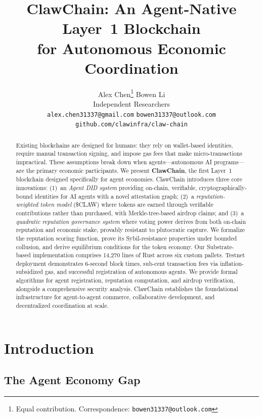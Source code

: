 \documentclass{article}
\title{ClawChain: An Agent-Native Layer~1 Blockchain \\for Autonomous Economic Coordination}
\author{
  Alex Chen\thanks{Equal contribution. Correspondence: \texttt{bowen31337@outlook.com}} \quad Bowen Li\footnotemark[1] \\[0.3em]
  Independent Researchers \\
  \texttt{alex.chen31337@gmail.com} \quad \texttt{bowen31337@outlook.com} \\
  \texttt{github.com/clawinfra/claw-chain}
}
\begin{document}
\maketitle

\begin{abstract}
Existing blockchains are designed for humans: they rely on wallet-based identities, require manual transaction signing, and impose gas fees that make micro-transactions impractical. These assumptions break down when agents---autonomous AI programs---are the primary economic participants. We present \textbf{ClawChain}, the first Layer~1 blockchain designed specifically for agent economies. ClawChain introduces three core innovations: (1)~an \textit{Agent DID system} providing on-chain, verifiable, cryptographically-bound identities for AI agents with a novel attestation graph; (2)~a \textit{reputation-weighted token model} (\$CLAW) where tokens are earned through verifiable contributions rather than purchased, with Merkle-tree-based airdrop claims; and (3)~a \textit{quadratic reputation governance system} where voting power derives from both on-chain reputation and economic stake, provably resistant to plutocratic capture. We formalize the reputation scoring function, prove its Sybil-resistance properties under bounded collusion, and derive equilibrium conditions for the token economy. Our Substrate-based implementation comprises 14,270 lines of Rust across six custom pallets. Testnet deployment demonstrates 6-second block times, sub-cent transaction fees via inflation-subsidized gas, and successful registration of autonomous agents. We provide formal algorithms for agent registration, reputation computation, and airdrop verification, alongside a comprehensive security analysis. ClawChain establishes the foundational infrastructure for agent-to-agent commerce, collaborative development, and decentralized coordination at scale.
\end{abstract}


\section{Introduction}

\subsection{The Agent Economy Gap}
\end{document}
